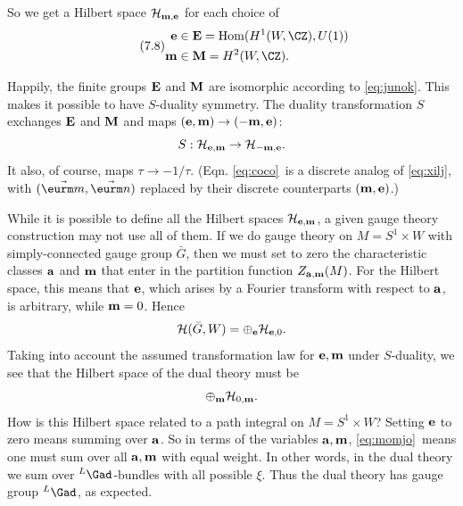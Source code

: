 So we get a Hilbert space ${\cal H}_{{\bf m},{\bf e}}$ for each
choice of %
\begin{equation*}
\tag*{(7.8)}
\begin{aligned}{\bf e}&\in {\bf E}={\rm
Hom}(H^1(W,\CZ), U(1))\\
                             {\bf m}& \in {\bf M}=H^2(W,\CZ).\\\end{aligned}
\end{equation*}

Happily, the finite groups ${\bf E}$ and ${\bf M}$ are isomorphic
according to \eqref{eq:junok}. This makes it possible to have $S$-duality
symmetry. The duality transformation $S$ exchanges ${\bf E}$ and
${\bf M}$ and maps $({\bf e},{\bf m})\to (-{\bf m},{\bf e})$:
\setcounter{equation}{8}
\begin{equation}\label{eq:coco}
S:{\cal H}_{{\bf e},{\bf m}}\to {\cal H}_{-{\bf m},{\bf
e}}.
\end{equation}
 It also, of course, maps $\tau\to -1/\tau$.  (Eqn. \eqref{eq:coco}\ is
a discrete analog of \eqref{eq:xilj}, with $(\vec{\eurm m},\vec{\eurm n})$
replaced by their discrete counterparts $({\bf m},{\bf e})$.)

While it is possible to define all the Hilbert spaces ${\cal
H}_{{\bf e},{\bf m}}$, a given gauge theory construction may not
use all of them.  If we do gauge theory on $M=S^1\times W$ with
simply-connected gauge group $\bar G$, then we must set to zero
the characteristic classes ${\bf a}$ and ${\bf m}$ that enter in
the partition function $Z_{{\bf a},{\bf m}}(M)$. For the Hilbert
space, this means that ${\bf e}$, which arises by a Fourier
transform with respect to ${\bf a}$, is arbitrary, while ${\bf
m}=0$.  Hence %
\setcounter{equation}{9}
\begin{equation}\label{eq:ytoto}
{\cal H}(\bar G,W)=\oplus_{{\bf e}}{\cal
H}_{{\bf e},0}.
\end{equation}
 Taking into account the assumed transformation
law for ${\bf e},{\bf m}$ under $S$-duality, we see that the
Hilbert space of the dual theory must be %
\setcounter{equation}{10}
\begin{equation}\label{eq:momjo}
\oplus_{{\bf
m}}{\cal H}_{0,{\bf m}}.
\end{equation}
 How is this Hilbert space related to a
path integral on $M=S^1\times W$? Setting $\bf e$ to zero means
summing over $\bf a$. So in terms of the variables ${\bf a},{\bf
m}$, \eqref{eq:momjo}\ means one must sum over all ${\bf a},{\bf m}$ with
equal weight. In other words, in the dual theory we sum over
$^L\Gad$-bundles with all possible $\xi$. Thus the dual theory has
gauge group $^L\Gad$, as expected.

